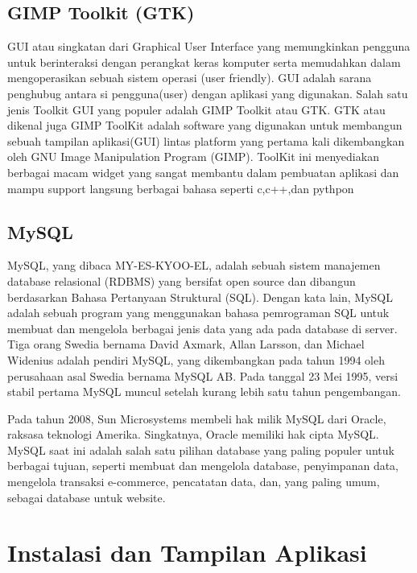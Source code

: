 \documentclass[a4paper,12pt]{article}
\begin{document}
\subsection{GIMP Toolkit (GTK)}
GUI atau singkatan dari Graphical User Interface yang memungkinkan pengguna untuk berinteraksi dengan perangkat keras komputer serta memudahkan dalam mengoperasikan sebuah sistem operasi (user friendly). GUI adalah sarana 
penghubug antara si pengguna(user) dengan aplikasi yang digunakan. Salah satu jenis Toolkit GUI yang populer adalah GIMP Toolkit atau GTK. 
GTK atau dikenal juga GIMP ToolKit adalah software yang digunakan untuk membangun sebuah tampilan aplikasi(GUI) lintas platform yang pertama kali dikembangkan oleh
GNU Image Manipulation Program (GIMP). ToolKit ini menyediakan berbagai macam widget yang sangat membantu dalam pembuatan aplikasi dan mampu support langsung berbagai bahasa seperti c,c++,dan pythpon

\subsection{MySQL}
MySQL, yang dibaca MY-ES-KYOO-EL, adalah sebuah sistem manajemen database relasional (RDBMS) yang bersifat open source dan dibangun berdasarkan Bahasa Pertanyaan Struktural (SQL). Dengan kata lain, MySQL adalah sebuah program yang menggunakan bahasa pemrograman SQL untuk membuat dan mengelola berbagai jenis data yang ada pada database di server. Tiga orang Swedia bernama David Axmark, Allan Larsson, dan Michael Widenius adalah pendiri MySQL, yang dikembangkan pada tahun 1994 oleh perusahaan asal Swedia bernama MySQL AB. Pada tanggal 23 Mei 1995, versi stabil pertama MySQL muncul setelah kurang lebih satu tahun pengembangan.

Pada tahun 2008, Sun Microsystems membeli hak milik MySQL dari Oracle, raksasa teknologi Amerika. Singkatnya, Oracle memiliki hak cipta MySQL. MySQL saat ini adalah salah satu pilihan database yang paling populer untuk berbagai tujuan, seperti membuat dan mengelola database, penyimpanan data, mengelola transaksi e-commerce, pencatatan data, dan, yang paling umum, sebagai database untuk website.

\section{Instalasi dan Tampilan Aplikasi}
\end{document}
